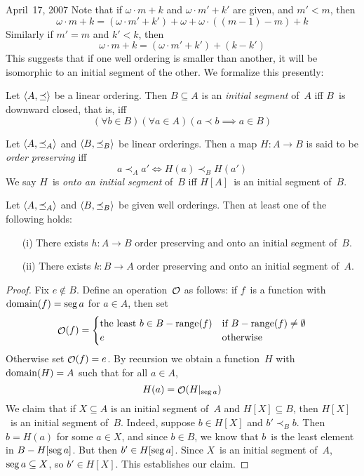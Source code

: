 \begin{lecture}{April~17, 2007}
Note that if \(\omega\cdot m+k\) and \(\omega\cdot m'+k'\) are given, and \(m'<m\), then
\[\omega\cdot m+k=(\omega\cdot m'+k')+\omega+\omega\cdot((m-1)-m)+k\]
Similarly if \(m'=m\) and \(k'<k\), then
\[\omega\cdot m+k=(\omega\cdot m'+k')+(k-k')\]
This suggests that if one well ordering is smaller than another, it will be isomorphic to an initial segment of the other. We formalize this presently:
\begin{defn}
Let \(\langle{A},{\preceq}\rangle\) be a linear ordering. Then \(B\subseteq A\) is an \emph{initial segment} of~\(A\) iff \(B\)~is downward closed, that is, iff
\[(\forall b\in B)(\forall a\in A)(a\prec b\implies a\in B)\]
\end{defn}
\begin{defn}
Let \(\langle{A},{\preceq_A}\rangle\) and \(\langle{B},{\preceq_B}\rangle\) be linear orderings. Then a map \(H:A\to B\) is said to be \emph{order preserving} iff
\[a\prec_A a'\iff H(a)\prec_B H(a')\]
We say \(H\)~is \emph{onto an initial segment} of~\(B\) iff \(H[A]\)~is an initial segment of~\(B\).
\end{defn}
\begin{thm}
Let \(\langle{A},{\preceq_A}\rangle\) and \(\langle{B},{\preceq_B}\rangle\) be given well orderings. Then at least one of the following holds:
\begin{enumerate}[itemsep=0pt]
\item[(i)] There exists \(h:A\to B\) order preserving and onto an initial segment of~\(B\).
\item[(ii)] There exists \(k:B\to A\) order preserving and onto an initial segment of~\(A\).
\end{enumerate}
\end{thm}
\begin{proof}
Fix \(e\not\in B\). Define an operation~\(\mathop{\mathcal{O}}\nolimits\) as follows: if \(f\)~is a function with \(\operatorname{domain}(f)=\operatorname{seg} a\) for \(a\in A\), then set
\[\mathop{\mathcal{O}}\nolimits(f)=
\begin{cases}
\text{the least }b\in B-\operatorname{range}(f)&\text{if }B-\operatorname{range}(f)\ne\emptyset\\
e&\text{otherwise}
\end{cases}\]
Otherwise set \(\mathop{\mathcal{O}}\nolimits(f)=e\). By recursion we obtain a function~\(H\) with \(\operatorname{domain}(H)=A\) such that for all \(a\in A\),
\[H(a)=\mathop{\mathcal{O}}\nolimits(H|_{\operatorname{seg} a})\]
We claim that if \(X\subseteq A\) is an initial segment of~\(A\) and \(H[X]\subseteq B\), then \(H[X]\)~is an initial segment of~\(B\). Indeed, suppose \(b\in H[X]\) and \(b'\prec_B b\). Then \(b=H(a)\) for some \(a\in X\), and since \(b\in B\), we know that \(b\)~is the least element in \(B-H[\operatorname{seg} a]\). But then \(b'\in H[\operatorname{seg} a]\). Since \(X\)~is an initial segment of~\(A\), \(\operatorname{seg} a\subseteq X\), so \(b'\in H[X]\). This establishes our claim.


\end{proof}
\end{lecture}
